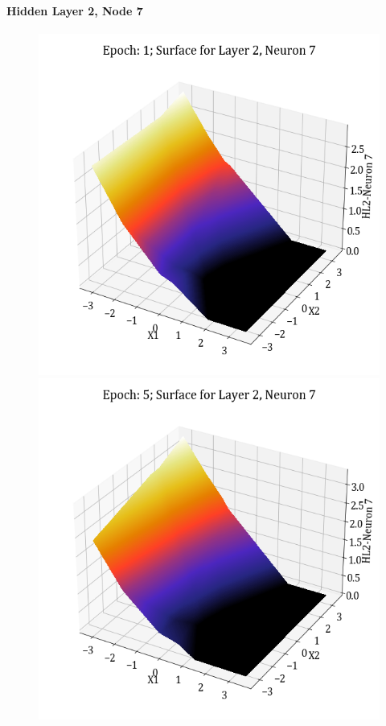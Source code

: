 \documentclass[11pt,a4paper]{article}
\begin{document}
\paragraph{Hidden Layer 2, Node 7}
\begin{figure}[H]
    \centering
    \includegraphics[scale=0.4]{images/1B_MLFFNN_E1_HL2_N7.png}
    \includegraphics[scale=0.4]{images/1B_MLFFNN_E5_HL2_N7.png}

\end{figure}
\end{document}

